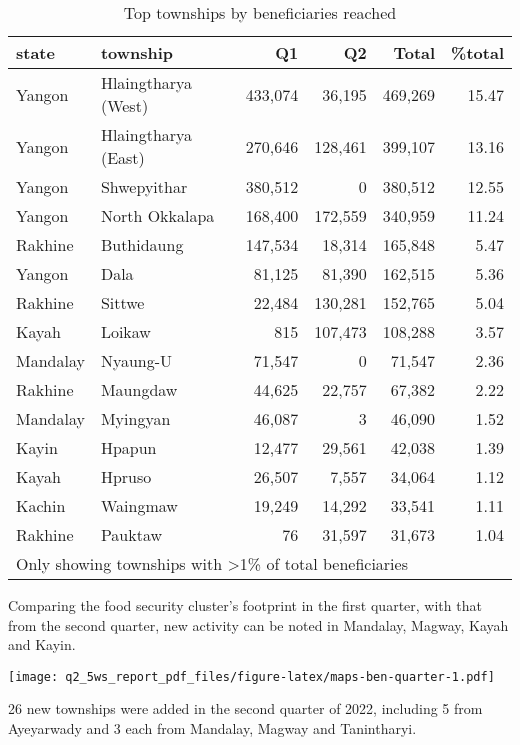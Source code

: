 \documentclass[
]{article}
\begin{document}
\begin{table}

\caption{\label{tab:table-top-townships}Top townships by beneficiaries reached}
\centering
\begin{tabular}[t]{l|l|r|r|r|r}
\hline
state & township & Q1 & Q2 & Total & \%total\\
\hline
Yangon & Hlaingtharya (West) & 433,074 & 36,195 & 469,269 & 15.47\\
\hline
Yangon & Hlaingtharya (East) & 270,646 & 128,461 & 399,107 & 13.16\\
\hline
Yangon & Shwepyithar & 380,512 & 0 & 380,512 & 12.55\\
\hline
Yangon & North Okkalapa & 168,400 & 172,559 & 340,959 & 11.24\\
\hline
Rakhine & Buthidaung & 147,534 & 18,314 & 165,848 & 5.47\\
\hline
Yangon & Dala & 81,125 & 81,390 & 162,515 & 5.36\\
\hline
Rakhine & Sittwe & 22,484 & 130,281 & 152,765 & 5.04\\
\hline
Kayah & Loikaw & 815 & 107,473 & 108,288 & 3.57\\
\hline
Mandalay & Nyaung-U & 71,547 & 0 & 71,547 & 2.36\\
\hline
Rakhine & Maungdaw & 44,625 & 22,757 & 67,382 & 2.22\\
\hline
Mandalay & Myingyan & 46,087 & 3 & 46,090 & 1.52\\
\hline
Kayin & Hpapun & 12,477 & 29,561 & 42,038 & 1.39\\
\hline
Kayah & Hpruso & 26,507 & 7,557 & 34,064 & 1.12\\
\hline
Kachin & Waingmaw & 19,249 & 14,292 & 33,541 & 1.11\\
\hline
Rakhine & Pauktaw & 76 & 31,597 & 31,673 & 1.04\\
\hline
\multicolumn{6}{l}{\rule{0pt}{1em}Only showing townships with >1\% of total beneficiaries}\\
\end{tabular}
\end{table}

Comparing the food security cluster's footprint in the first quarter,
with that from the second quarter, new activity can be noted in
Mandalay, Magway, Kayah and Kayin.

\texttt{[image: q2\_5ws\_report\_pdf\_files/figure-latex/maps-ben-quarter-1.pdf]}

26 new townships were added in the second quarter of 2022, including 5
from Ayeyarwady and 3 each from Mandalay, Magway and Tanintharyi.
\end{document}
